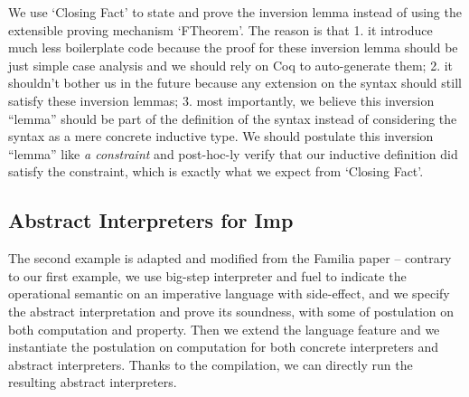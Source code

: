 We use `Closing Fact' to state and prove the inversion lemma instead of using the extensible proving mechanism `FTheorem'. The reason is that 1. it introduce much less boilerplate code because the proof for these inversion lemma should be just simple case analysis and we should rely on Coq to auto-generate them; 2. it shouldn't bother us in the future because any extension on the syntax should still satisfy these inversion lemmas; 3. most importantly, we believe this inversion ``lemma'' should be part of the definition of the syntax instead of considering the syntax as a mere concrete inductive type. We should postulate this inversion ``lemma'' like \textit{a constraint} and post-hoc-ly verify that our inductive definition did satisfy the constraint, which is exactly what we expect from `Closing Fact'.

\subsection{Abstract Interpreters for Imp}
The second example is adapted and modified from the Familia paper
-- contrary to our first example, we use big-step interpreter and fuel to indicate the operational semantic on an imperative language with side-effect, and we specify the abstract interpretation and prove its soundness, with some of postulation on both computation and property. Then we extend the language feature and we instantiate the postulation on computation for both concrete interpreters and abstract interpreters. Thanks to the compilation, we can directly run the resulting abstract interpreters.